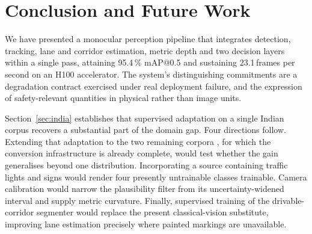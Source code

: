 \documentclass[conference]{IEEEtran}
\begin{document}
\section{Conclusion and Future Work}

We have presented a monocular perception pipeline that integrates detection,
tracking, lane and corridor estimation, metric depth and two decision layers
within a single pass, attaining 95.4\,\% mAP@0.5 and sustaining 23.1\,frames per
second on an H100 accelerator. The system's distinguishing commitments are a
degradation contract exercised under real deployment failure, and the expression
of safety-relevant quantities in physical rather than image units.

Section~\ref{sec:india} establishes that supervised adaptation on a single
Indian corpus recovers a substantial part of the domain gap. Four directions
follow. Extending that adaptation to the two remaining corpora
\cite{varma2019idd, kumar2025driveindia}, for which the conversion
infrastructure is already complete, would test whether the gain generalises
beyond one distribution. Incorporating a source containing traffic lights and
signs would render four presently untrainable classes trainable. Camera
calibration would narrow the plausibility filter from its uncertainty-widened
interval and supply metric curvature. Finally, supervised training of the
drivable-corridor segmenter would replace the present classical-vision
substitute, improving lane estimation precisely where painted markings are
unavailable.
\end{document}
